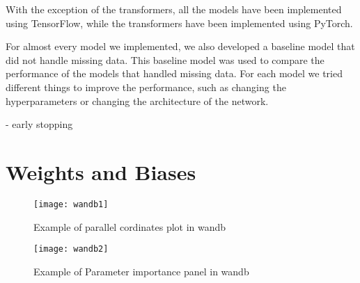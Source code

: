 With the exception of the transformers, all the models have been implemented using TensorFlow, while the transformers have been implemented using PyTorch.

For almost every model we implemented, we also developed a baseline model that did not handle missing data.
This baseline model was used to compare the performance of the models that handled missing data.
For each model we tried different things to improve the performance, such as changing the hyperparameters or changing the architecture of the network.
 

- early stopping\\

\section{Weights and Biases}

\begin{figure}[!htbp]
  \centering
  \texttt{[image: wandb1]}
  \caption{Example of parallel cordinates plot in wandb}
\end{figure}

\begin{figure}[!htbp]
  \centering
  \texttt{[image: wandb2]}
  \caption{Example of Parameter importance panel in wandb}
\end{figure}





